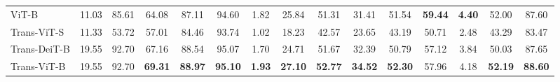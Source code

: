 \begin{table}[t]
\begin{tabular}{l|cc|ccc|ccc|ccc|ccc}
        ViT-B                    & 11.03 & 85.61  & 64.08                            & 87.11                                & 94.60                                & 1.82                                  & 25.84          & 51.31          & 31.41          & 51.54          & \textbf{59.44} & \textbf{4.40} & 52.00          & 87.60          \\
        Trans-ViT-S              & 11.33 & 53.72  & 57.01                            & 84.46                                & 93.74                                & 1.02                                  & 18.23          & 42.57          & 23.65          & 43.19          & 50.71          & 2.48          & 43.29          & 83.47          \\
        Trans-DeiT-B             & 19.55 & 92.70  & 67.16                            & 88.54                                & 95.07                                & 1.70                                  & 24.71          & 51.67          & 32.39          & 50.79          & 57.12          & 3.84          & 50.03          & 87.65          \\
        Trans-ViT-B              & 19.55 & 92.70  & \textbf{69.31}                   & \textbf{88.97}                       & \textbf{95.10}                       & \textbf{1.93}                         & \textbf{27.10} & \textbf{52.77} & \textbf{34.52} & \textbf{52.30} & 57.96          & 4.18          & \textbf{52.19} & \textbf{88.60} \\
        \hline
    \end{tabular}
    \vspace{3mm}
    \label{tab:bench_network}
\end{table}
 
